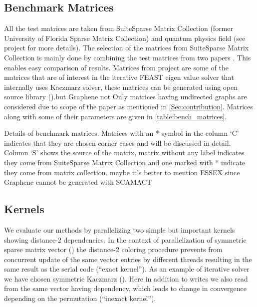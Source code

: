 \subsection{Benchmark Matrices}
All the test matrices are taken from SuiteSparse Matrix Collection (former University of Florida Sparse Matrix Collection) \cite{UOF} and quantum physics field (see \ESSEX project \cite{ESSEX} for more details). The selection of the matrices from SuiteSparse Matrix Collection is  mainly done by combining the test matrices from two papers \cite{RSB,park_ls}. This enables easy comparison of results. Matrices from \ESSEX project are some of the matrices that are of interest in the iterative FEAST eigen value solver that internally uses Kaczmarz solver, these matrices can be generated using \SCAMACTfull open source library (\SCAMACT).{\CA but Graphene not} %
  Only matrices having undirected graphs are considered due to scope of the paper as mentioned in \cref{Sec:contribution}. Matrices along with some of their parameters are given in \cref{table:bench_matrices}. 
\begin{table}[ht]
	\footnotesize
	\caption{Details of benchmark matrices. Matrices with an * symbol in the column `C' indicates that they are chosen corner cases and will be discussed in detail. Column `S' shows the source of the matrix, matrix without any label indicates they come from SuiteSparse Matrix Collection and one marked with * indicate they come from \SCAMACT matrix collection. {\CA maybe it's better to mention ESSEX since Graphene cannot be generated with SCAMACT} }\label{tab:test_mtx}
	\label{table:bench_matrices}
	\begin{center}
		
	\end{center}
\end{table}

\subsection{Kernels} \label{subsec:test_kernels}
We evaluate our methods by parallelizing two simple but important kernels showing distance-2 dependencies. In the context of parallelization of symmetric sparse matrix vector (\SymmSpmv) the distance-2 coloring procedure prevents from concurrent update of the same vector entries by different threads resulting in the same result as the serial code (``exact kernel''). As an example of iterative solver we have chosen symmetric Kaczmarz (\SYMMKACZ). Here in addition to writes we also read from the same vector having dependency, which leads to change in convergence depending on the permutation (``inexact kernel'').

